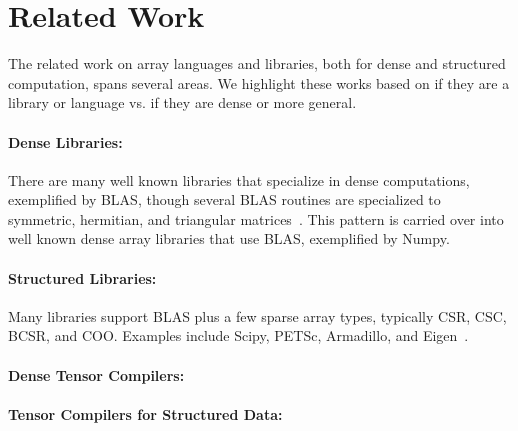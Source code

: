 \section{Related Work}

The related work on array languages and libraries, both for dense and structured computation, spans several areas.
%
We highlight these works based on if they are a library or language vs. if they are dense or more general.

\paragraph{Dense Libraries:} There are many well known libraries that specialize in dense computations, exemplified by BLAS, though several BLAS routines are specialized to symmetric, hermitian, and triangular matrices~\cite{Anderson1999}.
%
This pattern is carried over into well known dense array libraries that use BLAS, exemplified by Numpy.

\paragraph{Structured Libraries:}

Many libraries support BLAS plus a few sparse array types, typically CSR, CSC, BCSR, and COO.
%
Examples include Scipy, PETSc, Armadillo, and Eigen~\cite{virtanen2020scipy, abhyankarpetsc, Rumengan2021, eigenweb}.


\paragraph{Dense Tensor Compilers:}

\paragraph{Tensor Compilers for Structured Data:}




